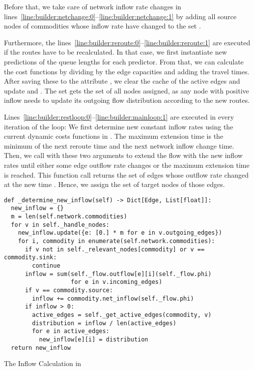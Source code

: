 Before that, we take care of network inflow rate changes in lines~\ref{line:builder:netchange:0}--\ref{line:builder:netchange:1} by adding all source nodes of commodities whose inflow rate have changed to the set .

Furthermore, the lines~\ref{line:builder:reroute:0}--\ref{line:builder:reroute:1} are executed if the routes have to be recalculated.
In that case, we first instantiate new predictions of the queue lengths for each predictor.
From that, we can calculate the cost functions by dividing by the edge capacities and adding the travel times.
After saving these to the attribute , we clear the cache of the active edges and update  and .
The set  gets the set of all nodes assigned, as any node with positive inflow needs to update its outgoing flow distribution according to the new routes.

Lines~\ref{line:builder:restloop:0}--\ref{line:builder:mainloop:1} are executed in every iteration of the loop:
We first determine new constant inflow rates using the current dynamic costs functions in .
The maximum extension time is the minimum of the next reroute time and the next network inflow change time.
Then, we call  with these two arguments to extend the flow with the new inflow rates until either some edge outflow rate changes or the maximum extension time is reached.
This function call returns the set of edges whose outflow rate changed at the new time .
Hence, we assign  the set of target nodes of those edges. 

\begin{algorithm}
  \begin{verbatim}
def _determine_new_inflow(self) -> Dict[Edge, List[float]]:
  new_inflow = {}
  m = len(self.network.commodities)
  for v in self._handle_nodes:
    new_inflow.update({e: [0.] * m for e in v.outgoing_edges})
    for i, commodity in enumerate(self.network.commodities):
      if v not in self._relevant_nodes[commodity] or v == commodity.sink:
        continue
      inflow = sum(self._flow.outflow[e][i](self._flow.phi)
                   for e in v.incoming_edges)
      if v == commodity.source:
        inflow += commodity.net_inflow(self._flow.phi)
      if inflow > 0:
        active_edges = self._get_active_edges(commodity, v)
        distribution = inflow / len(active_edges)
        for e in active_edges:
          new_inflow[e][i] = distribution
  return new_inflow
\end{verbatim}
\caption{The Inflow Calculation in }
\label{alg:determine-new-inflow}
\end{algorithm}


